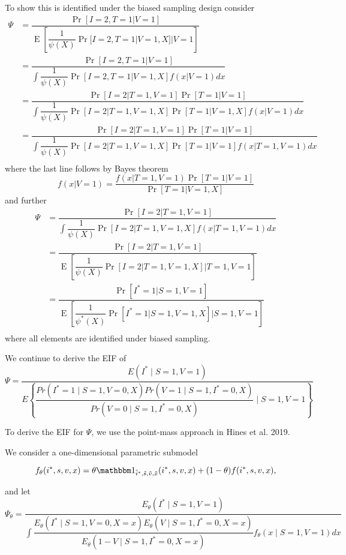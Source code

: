 \documentclass{article}
\DeclareMathOperator{\E}{E}
\begin{document}
To show this is identified under the biased sampling design consider
\begin{align*}
    \Psi &= \dfrac{\Pr[I = 2, T = 1 | V = 1]}{\E\left[\dfrac{1}{\psi(X)} \Pr[I = 2, T = 1 | V = 1, X] | V = 1\right]} \\
    &= \dfrac{\Pr[I = 2, T = 1 | V = 1]}{\int \dfrac{1}{\psi(X)} \Pr[I = 2, T = 1 | V = 1, X] f(x | V = 1) dx} \\
    &= \dfrac{\Pr[I = 2 | T = 1, V = 1] \Pr[T = 1 | V = 1]}{\int \dfrac{1}{\psi(X)} \Pr[I = 2 | T = 1, V = 1, X] \Pr[T = 1 | V = 1, X]  f(x | V = 1) dx} \\
    &= \dfrac{\Pr[I = 2 | T = 1, V = 1] \Pr[T = 1 | V = 1]}{\int \dfrac{1}{\psi(X)} \Pr[I = 2 | T = 1, V = 1, X] \Pr[T = 1 | V = 1]  f(x | T = 1, V = 1) dx} \\
\end{align*}
where the last line follows by Bayes theorem 
\begin{equation*}
    f(x | V = 1) = \dfrac{f(x | T = 1, V = 1)\Pr[T = 1 | V = 1]}{\Pr[T = 1 | V = 1, X]}
\end{equation*}
and further
\begin{align*}
    \Psi &= \dfrac{\Pr[I = 2 | T = 1, V = 1]}{\int \dfrac{1}{\psi(X)} \Pr[I = 2 | T = 1, V = 1, X] f(x | T = 1, V = 1) dx} \\
    &= \dfrac{\Pr[I = 2 | T = 1, V = 1]}{\E\left[\dfrac{1}{\psi(X)} \Pr[I = 2 | T = 1, V = 1, X] \bigg| T = 1, V = 1\right]} \\
    &= \dfrac{\Pr[I^* = 1 | S = 1, V = 1]}{\E\left[\dfrac{1}{\psi^*(X)} \Pr[I^* = 1 | S = 1, V = 1, X] \bigg| S = 1, V = 1\right]} \\
\end{align*}
where all elements are identified under biased sampling.


We continue to derive the EIF of
$$\Psi = \dfrac{E(I^*\mid S=1, V=1)}{E\left\{\dfrac{Pr(I^*=1\mid S=1, V=0, X)Pr(V=1\mid S=1, I^*=0, X)}{Pr(V=0\mid S=1, I^*=0, X)}\mid S=1, V=1\right\}}$$

To derive the EIF for $\Psi$, we use the point-mass approach in Hines et al. 2019.


We consider a one-dimensional parametric submodel

$$f_\theta(i^*, s, v, x)=\theta \mathbbm 1_{\tilde i^*, \tilde s, \tilde v, \tilde x}(i^*, s, v, x) + (1-\theta)f(i^*, s, v,x),$$

and let
$$\Psi_\theta = \dfrac{E_\theta(I^*\mid S=1, V=1)}{\int \dfrac{E_\theta(I^*\mid S=1, V=0, X=x)E_\theta(V \mid S=1, I^*=0, X=x)}{E_\theta(1-V\mid S=1, I^*=0, X=x)}f_\theta(x\mid S=1, V=1)dx}$$
\end{document}
